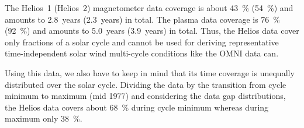 The Helios~1 (Helios~2) magnetometer data coverage is about 43~\% (54~\%) and amounts to 2.8~years (2.3~years) in total. The plasma data coverage is 76~\% (92~\%) and amounts to 5.0~years (3.9~years) in total.
Thus, the Helios data cover only fractions of a solar cycle and cannot be used for deriving representative time-independent solar wind multi-cycle conditions like the OMNI data can.

Using this data, we also have to keep in mind that its time coverage is unequally distributed over the solar cycle. Dividing the data by the transition from cycle minimum to maximum (mid 1977) and considering the data gap distributions, the Helios data covers about \SI{68}{\percent} during cycle minimum whereas during maximum only \SI{38}{\percent}.

% 

